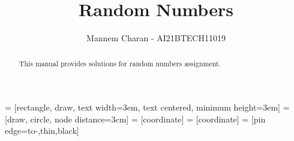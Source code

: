 \documentclass[journal,12pt,twocolumn]{IEEEtran}
\makeatletter
\renewcommand\thesection{\arabic{section}}
\renewcommand{\thefigure}{S\@arabic\c@figure}
\theoremstyle{remark}
\providecommand{\gauss}[2]{\mathcal{N}\ensuremath{\left(#1,#2\right)}}
\providecommand{\dec}[2]{\ensuremath{\overset{#1}{\underset{#2}{\gtrless}}}}
\numberwithin{equation}{section}
\let\StandardTheFigure\thefigure
\let\vec\mathbf
\renewcommand{\thefigure}{\theproblem.\arabic{figure}}
\renewcommand{\thefigure}{\theproblem}
\makeatother
\begin{document}
	\providecommand{\gauss}[2]{\mathcal{N}\ensuremath{\left(#1,#2\right)}}
	\providecommand{\dec}[2]{\ensuremath{\overset{#1}{\underset{#2}{\gtrless}}}}
	\DeclarePairedDelimiter{\ceil}{\lceil}{\rceil}
	\makeatletter
	\makeatother
	\let\StandardTheFigure\thefigure
	\renewcommand{\thefigure}{\thesection}
	\makeatletter
	\makeatother
	\let\StandardTheFigure\thefigure
	\let\StandardTheTable\thetable
	\let\vec\mathbf
	\vspace{3cm}
	\title{%
		Random Numbers
	}
	\author{Mannem Charan - AI21BTECH11019}
	\maketitle
	\tableofcontents
	\bigskip
	\renewcommand{\thefigure}{\theenumi}
	\renewcommand{\thetable}{\theenumi}
	\begin{abstract}
		This manual provides solutions for random numbers assignment.
	\end{abstract} = [rectangle, draw,
text width=3em, text centered, minimum height=3em]
 = [draw, circle, node distance=3cm]
 = [coordinate]
 = [coordinate]
 = [pin edge={to-,thin,black}]
\end{document}

